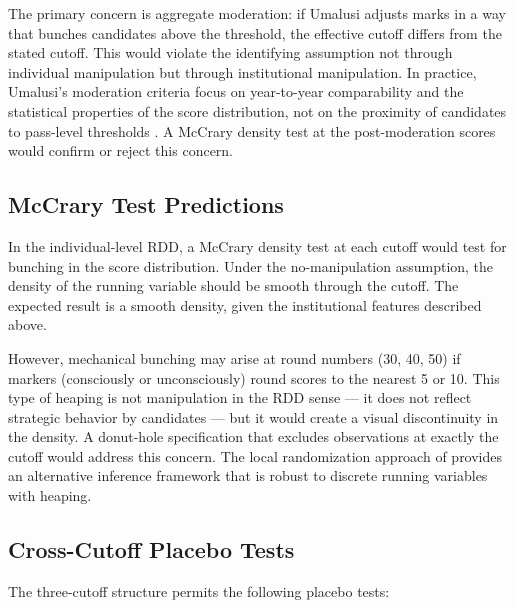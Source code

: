 \documentclass[12pt]{article}
\begin{document}
The primary concern is aggregate moderation: if Umalusi adjusts marks in a way that bunches candidates above the threshold, the effective cutoff differs from the stated cutoff. This would violate the identifying assumption not through individual manipulation but through institutional manipulation. In practice, Umalusi's moderation criteria focus on year-to-year comparability and the statistical properties of the score distribution, not on the proximity of candidates to pass-level thresholds \citep{dbe2022nsc}. A McCrary density test at the post-moderation scores would confirm or reject this concern.

\subsection{McCrary Test Predictions}

In the individual-level RDD, a McCrary density test \citep{mccrary2008manipulation} at each cutoff would test for bunching in the score distribution. Under the no-manipulation assumption, the density of the running variable should be smooth through the cutoff. The expected result is a smooth density, given the institutional features described above.

However, mechanical bunching may arise at round numbers (30, 40, 50) if markers (consciously or unconsciously) round scores to the nearest 5 or 10. This type of heaping is not manipulation in the RDD sense --- it does not reflect strategic behavior by candidates --- but it would create a visual discontinuity in the density. A donut-hole specification that excludes observations at exactly the cutoff would address this concern. The local randomization approach of \citet{cattaneo2019practical} provides an alternative inference framework that is robust to discrete running variables with heaping.

\subsection{Cross-Cutoff Placebo Tests}

The three-cutoff structure permits the following placebo tests:
\end{document}
